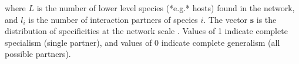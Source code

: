 where $L$ is the number of lower level species (*e.g.* hosts) found in
the network, and $l_i$ is the number of interaction partners of species
$i$. The vector $\mathbf{s}$ is the distribution of specificities at the
network scale . Values of 1 indicate complete specialism (single partner),
and values of 0 indicate complete generalism (all possible partners).
